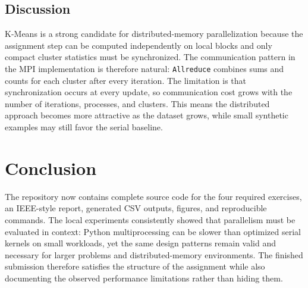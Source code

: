 \documentclass[conference]{IEEEtran}
\begin{document}
\subsection{Discussion}
K-Means is a strong candidate for distributed-memory parallelization because the assignment step can be computed independently on local blocks and only compact cluster statistics must be synchronized. The communication pattern in the MPI implementation is therefore natural: \texttt{Allreduce} combines sums and counts for each cluster after every iteration. The limitation is that synchronization occurs at every update, so communication cost grows with the number of iterations, processes, and clusters. This means the distributed approach becomes more attractive as the dataset grows, while small synthetic examples may still favor the serial baseline.

\section{Conclusion}
The repository now contains complete source code for the four required exercises, an IEEE-style report, generated CSV outputs, figures, and reproducible commands. The local experiments consistently showed that parallelism must be evaluated in context: Python multiprocessing can be slower than optimized serial kernels on small workloads, yet the same design patterns remain valid and necessary for larger problems and distributed-memory environments. The finished submission therefore satisfies the structure of the assignment while also documenting the observed performance limitations rather than hiding them.
\end{document}
